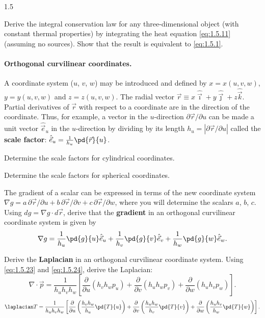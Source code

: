 \begin{exercises}{1.5}
\item Derive the integral conservation law for any three-dimensional object (with constant thermal properties) by integrating the heat equation \eqref{eq:1.5.11} (assuming no sources). Show that the result is equivalent to \eqref{eq:1.5.1}.

\paragraph{Orthogonal curvilinear coordinates.}
A coordinate system ($u$, $v$, $w$) may be introduced and defined by $x = x(u,v,w)$, $y = y(u,v,w)$ and $z = z(u,v,w)$. The radial vector $\vec{r} \equiv x\hat{\vec{\imath}} + y\hat{\vec{\jmath}} + z\hat{\vec{k}}$. Partial derivatives of $\vec{r}$ with respect to a coordinate are in the direction of the coordinate. Thus, for example, a vector in the $u$-direction $\partial\vec{r}/\partial u$ can be made a unit vector $\hat{\vec{e}}_u$ in the $u$-direction by dividing by its length $h_u = |\partial\vec{r}/\partial u|$ called the \textbf{scale factor}: $\hat{\vec{e}}_u = \frac{1}{h_u}\pd{\vec{r}}{u}$.

\item Determine the scale factors for cylindrical coordinates.

\item Determine the scale factors for spherical coordinates.

\item The gradient of a scalar can be expressed in terms of the new coordinate system $\nabla g = a\,\partial\vec{r}/\partial u + b\,\partial\vec{r}/\partial v + c\,\partial\vec{r}/\partial w$, where you will determine the scalars $a$, $b$, $c$. Using $dg = \nabla g\cdot d\vec{r}$, derive that the \textbf{gradient} in an orthogonal curvilinear coordinate system is given by
\begin{equation}
\nabla g = \frac{1}{h_u}\pd{g}{u}\hat{\vec{e}}_u + \frac{1}{h_v}\pd{g}{v}\hat{\vec{e}}_v + \frac{1}{h_w}\pd{g}{w}\hat{\vec{e}}_w.
\label{eq:1.5.23}
\end{equation}

\item Derive the \textbf{Laplacian} in an orthogonal curvilinear coordinate system. Using \eqref{eq:1.5.23} and \eqref{eq:1.5.24}, derive the Laplacian:
\begin{equation}
\nabla\cdot\vec{p} = \frac{1}{h_u h_v h_w}\left[\frac{\partial}{\partial u}(h_v h_w p_u) + \frac{\partial}{\partial v}(h_u h_w p_v) + \frac{\partial}{\partial w}(h_u h_v p_w)\right].
\label{eq:1.5.24}
\end{equation}
\begin{equation}
\laplacian T = \frac{1}{h_u h_v h_w}\left[\frac{\partial}{\partial u}\left(\frac{h_v h_w}{h_u}\pd{T}{u}\right) + \frac{\partial}{\partial v}\left(\frac{h_u h_w}{h_v}\pd{T}{v}\right) + \frac{\partial}{\partial w}\left(\frac{h_u h_v}{h_w}\pd{T}{w}\right)\right].
\label{eq:1.5.25}
\end{equation}


\end{exercises}
